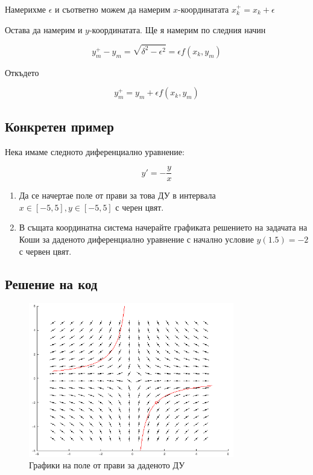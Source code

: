 \documentclass{scrartcl}
\begin{document}
Намерихме $\epsilon$ и съответно можем да намерим $x$-координатата $x_k^+ = x_k + \epsilon$

Остава да намерим и $y$-координатата. Ще я намерим по следния начин

$$y_m^+ - y_m = \sqrt{\delta^2-\epsilon^2} = \epsilon f(x_k, y_m)$$

Откъдето

$$y_m^+ = y_m + \epsilon f(x_k, y_m)$$

\subsection{Конкретен пример}

Нека имаме следното диференциално уравнение:

$$y' = -\dfrac{y}{x}$$

\begin{enumerate}
    \item Да се начертае поле от прави за това ДУ в интервала $x\in[-5, 5], y\in[-5,5]$ с черен цвят.
    \item В същата координатна система начерайте графиката решението на задачата на Коши за даденото диференциално уравнение с начално условие $y(1.5) = -2$ с червен цвят.
\end{enumerate}

\subsection{Решение на код}



\begin{figure}[H]
    \centering
    \includegraphics[width=0.8\textwidth]{slope_field_picture.png}
    \caption{Графики на поле от прави за даденото ДУ}
    \label{fig:slope_field_picture}
\end{figure}
\end{document}
